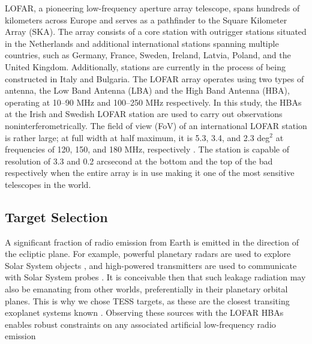 LOFAR, a pioneering low-frequency aperture array telescope, spans hundreds of kilometers across Europe and serves as a pathfinder to the Square Kilometer Array (SKA). The array consists of a core station with outrigger stations situated in the Netherlands and additional international stations spanning multiple countries, such as Germany, France, Sweden, Ireland, Latvia, Poland, and the United Kingdom. Additionally, stations are currently in the process of being constructed in Italy and Bulgaria. The LOFAR array operates using two types of antenna, the Low Band Antenna (LBA) and the High Band Antenna (HBA), operating at 10–90 MHz and 100–250 MHz respectively. In this study, the HBAs at the Irish and Swedish LOFAR station are used to carry out observations noninterferometrically. The field of view (FoV) of an international LOFAR station is rather large; at full width at half maximum, it is 5.3, 3.4, and 2.3 deg$^2$ at frequencies of 120, 150, and 180 MHz, respectively \citep{van_haarlem_lofar_2013}. The station is capable of resolution of 3.3 and 0.2 arcsecond at the bottom and the top of the bad respectively when the entire array is in use making it one of the most sensitive telescopes in the world.

\subsection{Target Selection}


A significant fraction of radio emission from Earth is emitted in the direction of the ecliptic plane. For example, powerful planetary radars are used to explore Solar System objects \citep{Siemion_KEPLER_ApJ}, and high-powered transmitters are used to communicate with Solar System probes \citep{Enriquez2017ApJ}. It is conceivable then that such leakage radiation may also be emanating from other worlds, preferentially in their planetary orbital planes. This is why we chose TESS targets, as these are the closest transiting exoplanet systems known \citep{Kepler_Mission_Design_2010,TESS2015}. Observing these sources with the LOFAR HBAs enables robust constraints on any associated artificial low-frequency radio emission


